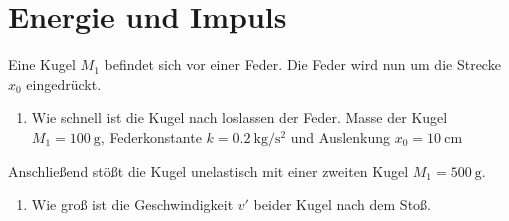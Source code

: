 \section{Energie und Impuls}
Eine Kugel $M_1$ befindet sich vor einer Feder.
Die Feder wird nun um die Strecke $x_0$ eingedrückt.
\begin{enumerate}
\item{ Wie schnell ist die Kugel nach loslassen der Feder. Masse der Kugel $M_1=\SI{100}{\gram}$, 
Federkonstante $k=\SI{0.2}{\kilo\gram\per\square\second}$ und Auslenkung $x_0=\SI{10}{\centi\meter}$}
\end{enumerate}
Anschließend stößt die Kugel unelastisch mit einer zweiten Kugel $M_1=\SI{500}{\gram}$.
\begin{enumerate}
\item {Wie groß ist die Geschwindigkeit $v'$ beider Kugel nach dem Stoß.}
\end{enumerate}